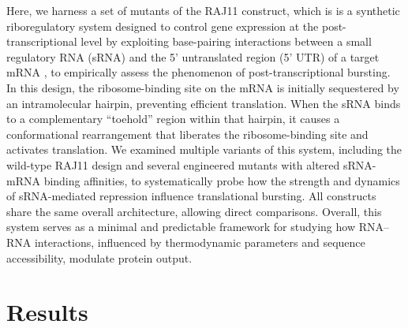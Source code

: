 Here, we harness a set of mutants of the RAJ11 construct, which is is a synthetic riboregulatory system designed to control gene expression at the post-transcriptional level by exploiting base-pairing interactions between a small regulatory RNA (sRNA) and the 5' untranslated region (5' UTR) of a target mRNA \cite{Rodrigo2015}, to empirically assess the phenomenon of post-transcriptional bursting. In this design, the ribosome-binding site on the mRNA is initially sequestered by an intramolecular hairpin, preventing efficient translation. When the sRNA binds to a complementary ``toehold'' region within that hairpin, it causes a conformational rearrangement that liberates the ribosome-binding site and activates translation. We examined multiple variants of this system, including the wild-type RAJ11 design and several engineered mutants with altered sRNA-mRNA binding affinities, to systematically probe how the strength and dynamics of sRNA-mediated repression influence translational bursting. All constructs share the same overall architecture, allowing direct comparisons. Overall, this system serves as a minimal and predictable framework for studying how RNA--RNA interactions, influenced by thermodynamic parameters and sequence accessibility, modulate protein output.



\section*{Results}


